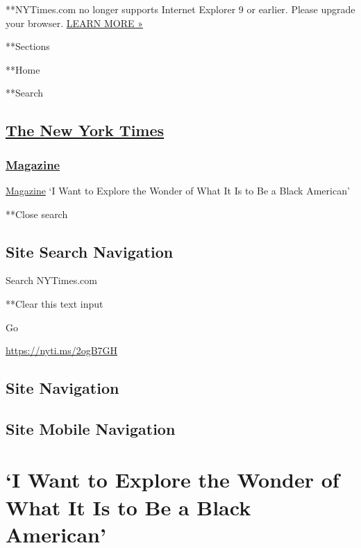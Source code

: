  **NYTimes.com no longer supports Internet Explorer 9 or earlier. Please
upgrade your browser.
\href{http://www.nytimes3xbfgragh.onion/content/help/site/ie9-support.html}{LEARN
MORE »}

**Sections

**Home

**Search

\hypertarget{the-new-york-times}{%
\subsection{\texorpdfstring{\href{http://www.nytimes3xbfgragh.onion/}{The
New York Times}}{The New York Times}}\label{the-new-york-times}}

\hypertarget{-magazine-}{%
\subsubsection{\texorpdfstring{
\href{https://www.nytimes3xbfgragh.onion/section/magazine}{Magazine}
}{ Magazine }}\label{-magazine-}}

 \href{https://www.nytimes3xbfgragh.onion/section/magazine}{Magazine}
\textbar{}`I Want to Explore the Wonder of What It Is to Be a Black
American'

**Close search

\hypertarget{site-search-navigation}{%
\subsection{Site Search Navigation}\label{site-search-navigation}}

Search NYTimes.com

**Clear this text input

Go

\url{https://nyti.ms/2ogB7GH}

\hypertarget{site-navigation}{%
\subsection{Site Navigation}\label{site-navigation}}

\hypertarget{site-mobile-navigation}{%
\subsection{Site Mobile Navigation}\label{site-mobile-navigation}}

\hypertarget{i-want-to-explore-the-wonder-of-what-it-is-to-be-a-black-american}{%
\section{`I Want to Explore the Wonder of What It Is to Be a Black
American'}\label{i-want-to-explore-the-wonder-of-what-it-is-to-be-a-black-american}}


